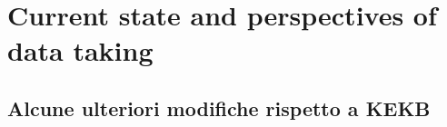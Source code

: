 \newpage




\section{Current state and perspectives of data taking}












\subsection{Alcune ulteriori modifiche rispetto a KEKB}

\begin{comment}

L'upgrade da KEKB a SuperKEKB, come in parte visto, ha richiesto importanti cambiamenti nei fasci e nello schema di collisione, tutto volto a raggiungere nuove vette di luimnosità. Altre fondamentali modifiche sono state fatte lungo l'anello di collisione, tra cui:

\begin{item}
\item rifacimento della regione d'interazione, che comprende 4 m intorno al PI, in modo da poter ospitare il nuovo detector Belle II, il sistema di focusing finale dei fasci e le due beam pipes;
\item il sistema a radiofrequenza è stato modificato per permettere una corrente maggiore dei fasci;
\item l'aggiunta di alcuni collimatori lungo entrambi gli anelli (11 nel LER  e 20 nel HER) per poter limitare il danno da radiazione sul rivelatore e i ''quenches'' dei magneti superconduttori, cioè un surriscaldamento dei suoi avvolgimenti che genericamente causa la perdità della superconduttività, dissipando la corrente circolante.
\item anche il sistema di vuoto è stato migliorato per limitare alcuni effetti collegati alla perdita di potenza del fascio, allungando quindi la vita media del fascio stesso.
\end{item}

\end{comment}
